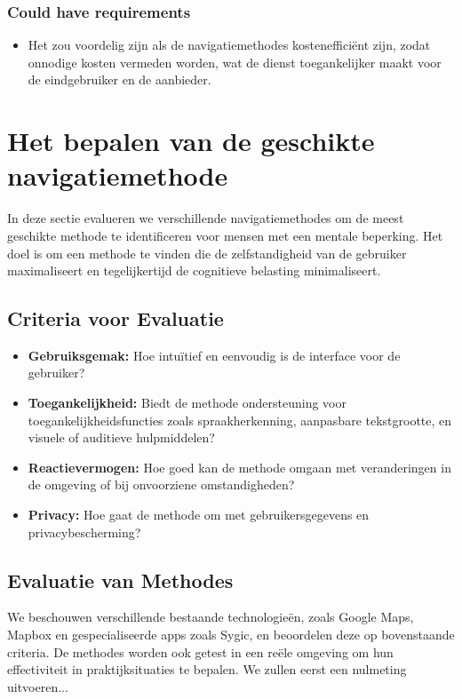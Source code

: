 \subsubsection{Could have requirements}
\begin{itemize}
    \item Het zou voordelig zijn als de navigatiemethodes kostenefficiënt zijn, zodat onnodige kosten vermeden worden, wat de dienst toegankelijker maakt voor de eindgebruiker en de aanbieder.
\end{itemize}

\section{Het bepalen van de geschikte navigatiemethode}
\label{sec:bepalen geschikte navigatiemethode}

In deze sectie evalueren we verschillende navigatiemethodes om de meest geschikte methode te identificeren voor mensen met een mentale beperking. Het doel is om een methode te vinden die de zelfstandigheid van de gebruiker maximaliseert en tegelijkertijd de cognitieve belasting minimaliseert.

\subsection{Criteria voor Evaluatie}
\begin{itemize}
    \item \textbf{Gebruiksgemak:} Hoe intuïtief en eenvoudig is de interface voor de gebruiker?
    \item \textbf{Toegankelijkheid:} Biedt de methode ondersteuning voor toegankelijkheidsfuncties zoals spraakherkenning, aanpasbare tekstgrootte, en visuele of auditieve hulpmiddelen?
    \item \textbf{Reactievermogen:} Hoe goed kan de methode omgaan met veranderingen in de omgeving of bij onvoorziene omstandigheden?
    \item \textbf{Privacy:} Hoe gaat de methode om met gebruikersgegevens en privacybescherming?
\end{itemize}

\subsection{Evaluatie van Methodes}
We beschouwen verschillende bestaande technologieën, zoals Google Maps, Mapbox en gespecialiseerde apps zoals Sygic, en beoordelen deze op bovenstaande criteria. De methodes worden ook getest in een reële omgeving om hun effectiviteit in praktijksituaties te bepalen. We zullen eerst een nulmeting uitvoeren...

